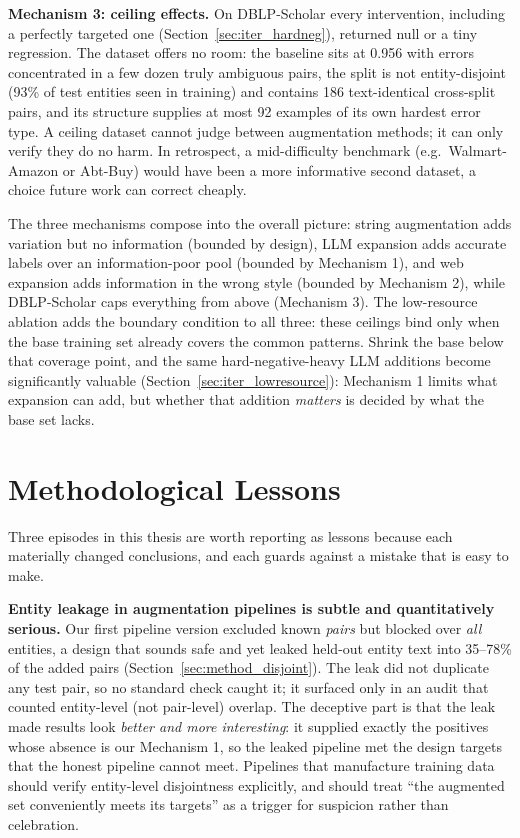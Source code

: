 \documentclass[a4paper,oneside,bibliography=totoc]{scrbook}
\begin{document}
\textbf{Mechanism 3: ceiling effects.} On DBLP-Scholar every intervention, including a perfectly targeted one (Section~\ref{sec:iter_hardneg}), returned null or a tiny regression. The dataset offers no room: the baseline sits at 0.956 with errors concentrated in a few dozen truly ambiguous pairs, the split is not entity-disjoint (93\% of test entities seen in training) and contains 186 text-identical cross-split pairs, and its structure supplies at most 92 examples of its own hardest error type. A ceiling dataset cannot judge between augmentation methods; it can only verify they do no harm. In retrospect, a mid-difficulty benchmark (e.g.\ Walmart-Amazon or Abt-Buy) would have been a more informative second dataset, a choice future work can correct cheaply.

The three mechanisms compose into the overall picture: string augmentation adds variation but no information (bounded by design), LLM expansion adds accurate labels over an information-poor pool (bounded by Mechanism 1), and web expansion adds information in the wrong style (bounded by Mechanism 2), while DBLP-Scholar caps everything from above (Mechanism 3). The low-resource ablation adds the boundary condition to all three: these ceilings bind only when the base training set already covers the common patterns. Shrink the base below that coverage point, and the same hard-negative-heavy LLM additions become significantly valuable (Section~\ref{sec:iter_lowresource}): Mechanism 1 limits what expansion can add, but whether that addition \emph{matters} is decided by what the base set lacks.

\section{Methodological Lessons}
\label{sec:disc_method}

Three episodes in this thesis are worth reporting as lessons because each materially changed conclusions, and each guards against a mistake that is easy to make.

\textbf{Entity leakage in augmentation pipelines is subtle and quantitatively serious.} Our first pipeline version excluded known \emph{pairs} but blocked over \emph{all} entities, a design that sounds safe and yet leaked held-out entity text into 35--78\% of the added pairs (Section~\ref{sec:method_disjoint}). The leak did not duplicate any test pair, so no standard check caught it; it surfaced only in an audit that counted entity-level (not pair-level) overlap. The deceptive part is that the leak made results look \emph{better and more interesting}: it supplied exactly the positives whose absence is our Mechanism 1, so the leaked pipeline met the design targets that the honest pipeline cannot meet. Pipelines that manufacture training data should verify entity-level disjointness explicitly, and should treat ``the augmented set conveniently meets its targets'' as a trigger for suspicion rather than celebration.
\end{document}
